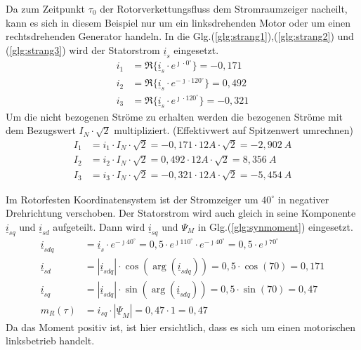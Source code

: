 \begin{solution}
\begin{compactenum}
\item  Da zum Zeitpunkt $\tau_0$ der Rotorverkettungsfluss dem Stromraumzeiger nacheilt, kann es sich in diesem Beispiel nur um ein linksdrehenden Motor oder um einen rechtsdrehenden Generator handeln. 
In die Glg.(\ref{glg:strang1}),(\ref{glg:strang2}) und (\ref{glg:strang3}) wird der Statorstrom $\underline{i}_s$ eingesetzt.
\begin{align}
i_1 & = \Re \{ \underline{i}_s \cdot e^{\jmath \cdot 0 ^\circ} \} = -0,171\\
i_2 & = \Re \{ \underline{i}_s \cdot e^{-\jmath \cdot 120 ^\circ} \} = 0,492 \\
i_3 & = \Re \{ \underline{i}_s \cdot e^{\jmath \cdot 120 ^\circ} \}=  -0,321
\end{align}
Um die nicht bezogenen Ströme zu erhalten werden die bezogenen Ströme mit dem Bezugswert $I_N \cdot \sqrt{2}$ multipliziert. (Effektivwert auf Spitzenwert umrechnen)
\begin{align}
I_1 & = i_1 \cdot I_N \cdot \sqrt{2} = -0,171 \cdot 12 A \cdot \sqrt{2} =-2,902~A \\
I_2 & = i_2 \cdot I_N \cdot \sqrt{2} = 0,492 \cdot 12 A \cdot \sqrt{2} =8,356~A \\
I_3 & = i_3 \cdot I_N \cdot \sqrt{2} =-0,321 \cdot 12 A \cdot \sqrt{2} =-5,454~A
\end{align}
\item Im Rotorfesten Koordinatensystem ist der Stromzeiger um $40^\circ$ in negativer Drehrichtung verschoben. Der Statorstrom wird auch gleich in seine Komponente $\underline{i}_{sq}$ und $\underline{i}_{sd}$ aufgeteilt. Dann wird $\underline{i}_{sq}$ und $\Psi_M$ in Glg.(\ref{glg:synmoment}) eingesetzt.
\begin{align}
\underline{i}_{sdq} & = \underline{i}_s \cdot e^{-\jmath 40 ^\circ} = 0,5 \cdot e^{\jmath 110 ^\circ} \cdot e^{-\jmath 40 ^\circ} = 0,5 \cdot e^{\jmath 70 ^\circ} \\
\underline{i}_{sd} & = |\underline{i}_{sdq}| \cdot \cos(\arg(\underline{i}_{sdq})) = 0,5 \cdot \cos(70) = 0,171 \\
\underline{i}_{sq} & = |\underline{i}_{sdq}| \cdot \sin(\arg(\underline{i}_{sdq})) = 0,5 \cdot \sin(70) = 0,47 \\
m_R(\tau)& =  i_{sq} \cdot | \underline{\Psi}_M|= 0,47\cdot 1 = 0,47
\end{align}
Da das Moment positiv ist, ist hier ersichtlich, dass es sich um einen motorischen linksbetrieb handelt.

\end{compactenum}
\end{solution}
